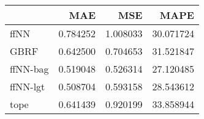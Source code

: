 \begin{tabular}{lrrr}
\toprule
{} &       MAE &       MSE &       MAPE \\
\midrule
ffNN     &  0.784252 &  1.008033 &  30.071724 \\
GBRF     &  0.642500 &  0.704653 &  31.521847 \\
ffNN-bag &  0.519048 &  0.526314 &  27.120485 \\
ffNN-lgt &  0.508704 &  0.593158 &  28.543612 \\
tope     &  0.641439 &  0.920199 &  33.858944 \\
\bottomrule
\end{tabular}
